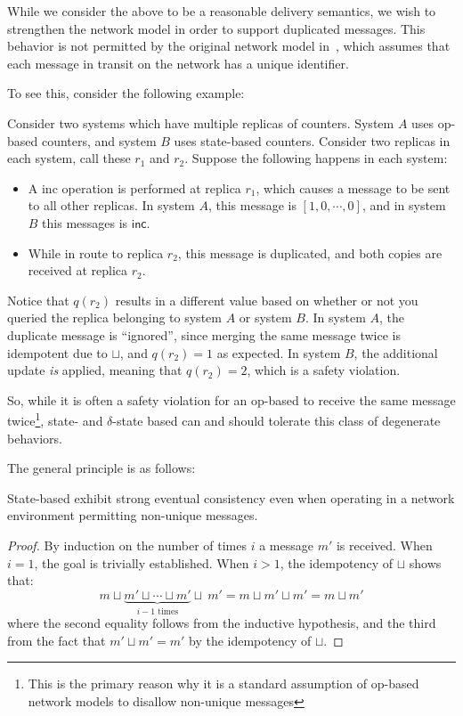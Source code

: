 While we consider the above to be a reasonable delivery semantics, we wish to
strengthen the network model in order to support duplicated messages. This
behavior is not permitted by the original network model in~\citep{gomes17},
which assumes that each message in transit on the network has a unique
identifier.

To see this, consider the following example:

\begin{example}
  \label{example:state-op-dup-msgs}
  Consider two systems which have multiple replicas of \CRDT counters. System
  $A$ uses op-based counters, and system $B$ uses state-based counters. Consider
  two replicas in each system, call these $r_1$ and $r_2$. Suppose the following
  happens in each system:

  \begin{itemize}
    \item A \textsf{inc} operation is performed at replica $r_1$, which causes a
      message to be sent to all other replicas. In system $A$, this message is
      $[1, 0, \cdots, 0]$, and in system $B$ this messages is $\textsf{inc}$.
    \item While in route to replica $r_2$, this message is duplicated, and both
      copies are received at replica $r_2$.
  \end{itemize}

  Notice that $q(r_2)$ results in a different value based on whether or not you
  queried the replica belonging to system $A$ or system $B$. In system $A$, the
  duplicate message is ``ignored'', since merging the same message twice is
  idempotent due to $\sqcup$, and $q(r_2) = 1$ as expected. In system $B$, the
  additional update \emph{is} applied, meaning that $q(r_2) = 2$, which is a
  safety violation.
\end{example}

So, while it is often a safety violation for an op-based \CRDT to receive the
same message twice\footnote{This is the primary reason why it is a standard
assumption of op-based network models to disallow non-unique messages},
state- and $\delta$-state based \CRDTs can and should tolerate this class of
degenerate behaviors.

The general principle is as follows:
\begin{theorem} \label{thm:state-sec-dup}
  State-based \CRDTs exhibit strong eventual consistency even when operating in
  a network environment permitting non-unique messages.
\end{theorem}
\begin{proof}
  By induction on the number of times $i$ a message $m'$ is received. When $i =
  1$, the goal is trivially established. When $i > 1$, the idempotency of
  $\sqcup$ shows that:
  \[
    m \sqcup \underbrace{m' \sqcup \cdots \sqcup m'}_{\text{$i-1$ times}} \sqcup~m'
      = m \sqcup m' \sqcup m'
      = m \sqcup m'
  \]
  where the second equality follows from the inductive hypothesis, and the third
  from the fact that $m' \sqcup m' = m'$ by the idempotency of $\sqcup$.
\end{proof}

